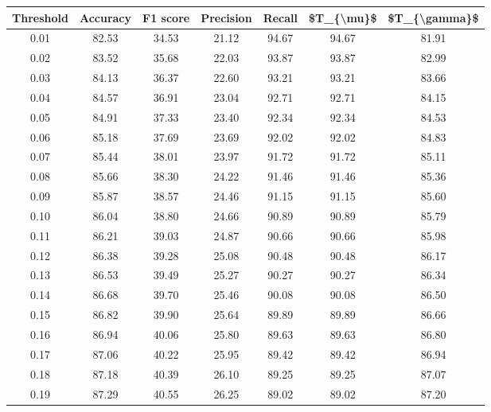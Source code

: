 \begin{tabular}{|c|c|c|c|c|c|c|}
\hline
 Threshold &  Accuracy &  F1 score &  Precision &  Recall &  \$T\_\{\textbackslash mu\}\$ &  \$T\_\{\textbackslash gamma\}\$ \\
\hline
      0.01 &     82.53 &     34.53 &      21.12 &   94.67 &      94.67 &         81.91 \\
      0.02 &     83.52 &     35.68 &      22.03 &   93.87 &      93.87 &         82.99 \\
      0.03 &     84.13 &     36.37 &      22.60 &   93.21 &      93.21 &         83.66 \\
      0.04 &     84.57 &     36.91 &      23.04 &   92.71 &      92.71 &         84.15 \\
      0.05 &     84.91 &     37.33 &      23.40 &   92.34 &      92.34 &         84.53 \\
      0.06 &     85.18 &     37.69 &      23.69 &   92.02 &      92.02 &         84.83 \\
      0.07 &     85.44 &     38.01 &      23.97 &   91.72 &      91.72 &         85.11 \\
      0.08 &     85.66 &     38.30 &      24.22 &   91.46 &      91.46 &         85.36 \\
      0.09 &     85.87 &     38.57 &      24.46 &   91.15 &      91.15 &         85.60 \\
      0.10 &     86.04 &     38.80 &      24.66 &   90.89 &      90.89 &         85.79 \\
      0.11 &     86.21 &     39.03 &      24.87 &   90.66 &      90.66 &         85.98 \\
      0.12 &     86.38 &     39.28 &      25.08 &   90.48 &      90.48 &         86.17 \\
      0.13 &     86.53 &     39.49 &      25.27 &   90.27 &      90.27 &         86.34 \\
      0.14 &     86.68 &     39.70 &      25.46 &   90.08 &      90.08 &         86.50 \\
      0.15 &     86.82 &     39.90 &      25.64 &   89.89 &      89.89 &         86.66 \\
      0.16 &     86.94 &     40.06 &      25.80 &   89.63 &      89.63 &         86.80 \\
      0.17 &     87.06 &     40.22 &      25.95 &   89.42 &      89.42 &         86.94 \\
      0.18 &     87.18 &     40.39 &      26.10 &   89.25 &      89.25 &         87.07 \\
      0.19 &     87.29 &     40.55 &      26.25 &   89.02 &      89.02 &         87.20 \\

\end{tabular}
